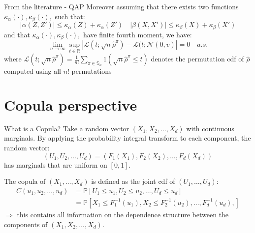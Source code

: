 \documentclass[10.5pt]{beamer}
\begin{document}
\begin{frame}{From the literature - QAP}
Moreover assuming that there exists two functions $\kappa_\alpha(\cdot), \kappa_\beta(\cdot),$ such that:
\[
|\alpha(Z, Z')| \le \kappa_\alpha(Z) + \kappa_\alpha(Z') \quad |\beta(X, X')| \le \kappa_\beta(X) + \kappa_\beta(X') 
\]
and that $\kappa_\alpha(\cdot), \kappa_\beta(\cdot),$ have finite fourth moment, we have:
\[
\lim_{n\to \infty}\sup_{t \in \mathbb{R}} |\mathcal{L}(t; \sqrt{n}\hat{\rho}^\pi) - \mathcal{L}(t; \mathcal{N}(0, v)|=0 \quad a.s.
\]
where $\mathcal{L}(t; \sqrt{n}\hat{\rho}^\pi)=\frac{1}{n!}\sum_{\pi\in \mathbb{S}_n} 1(\sqrt{n}\hat{\rho}^\pi \le t)$ denotes the permutation cdf of $\hat{\rho}$ computed using all $n!$ permutations
\vspace{.5em}

\end{frame}

\section{Copula perspective}
\begin{frame}{What is a Copula?}
Take a random vector $(X_1, X_2, \dots, X_d)$ with continuous marginals. By applying the probability integral transform to each component, the random vector:
\[
(U_1, U_2, \dots, U_d) = (F_1(X_1), F_2(X_2), \dots, F_d(X_d))
\]
has marginals that are uniform on $[0, 1]$.
\vspace{.5em}

The copula of $(X_1, \dots, X_d)$ is defined as the joint cdf of $(U_1, \dots, U_d)$:
\[
\begin{split}
    C(u_1, u_2, \dots, u_d) &= \mathbb{P}[U_1 \leq u_1, U_2 \leq u_2, \dots, U_d \leq u_d] \\
    &= \mathbb{P}[X_1 \leq F_1^{-1}(u_1), X_2 \leq F_2^{-1}(u_2), \dots, F_d^{-1}(u_d),]
\end{split}
\]
$\Rightarrow$ this contains all information on the dependence structure between the components of $(X_1, X_2, \dots, X_d)$.
\end{frame}
\end{document}
